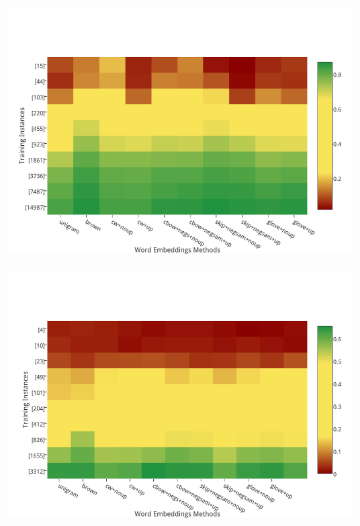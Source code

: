 \begin{figure}
\begin{subfigure}{7cm}
	\centering
    \includegraphics[scale=0.4]{plots/map-ner-color}    	
\end{subfigure}
\begin{subfigure}{7cm}
	\centering
    \includegraphics[scale=0.4]{plots/map-mwe-color}
\end{subfigure}
\label{fig:bestPOS-Chunk}
\end{figure}


